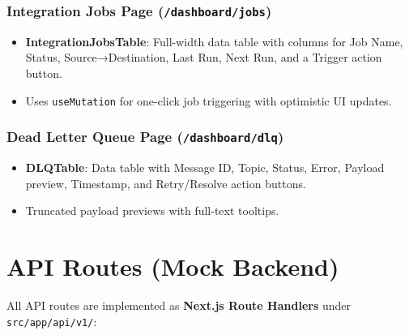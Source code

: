 \documentclass[12pt,a4paper]{article}
\begin{document}
\subsubsection{Integration Jobs Page (\texttt{/dashboard/jobs})}

\begin{itemize}[leftmargin=2em]
  \item \textbf{IntegrationJobsTable}: Full-width data table with columns for Job Name, Status, Source→Destination, Last Run, Next Run, and a Trigger action button.
  \item Uses \texttt{useMutation} for one-click job triggering with optimistic UI updates.
\end{itemize}

\subsubsection{Dead Letter Queue Page (\texttt{/dashboard/dlq})}

\begin{itemize}[leftmargin=2em]
  \item \textbf{DLQTable}: Data table with Message ID, Topic, Status, Error, Payload preview, Timestamp, and Retry/Resolve action buttons.
  \item Truncated payload previews with full-text tooltips.
\end{itemize}

\section{API Routes (Mock Backend)}

All API routes are implemented as \textbf{Next.js Route Handlers} under \texttt{src/app/api/v1/}:
\end{document}
